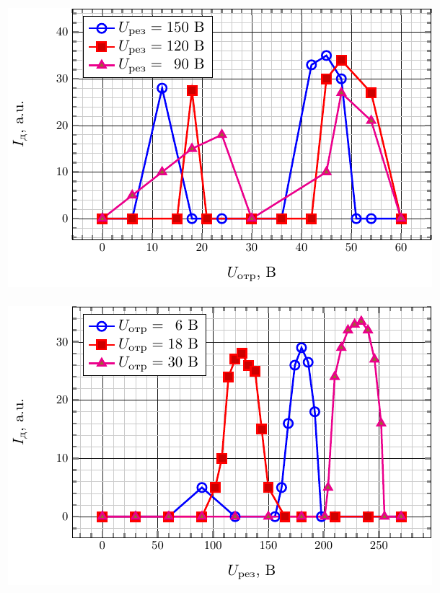 \documentclass[a4paper,14pt]{extarticle}
\begin{document}
\begin{figure}[H]
    \centering
    \includegraphics[scale=1.2]{fig2/id_from_uo.pdf}
    \caption{}
    \label{ris:3}
\end{figure}

\begin{figure}[H]
    \centering
    \includegraphics[scale=1.2]{fig2/id_from_ur.pdf}
    \caption{}
    \label{ris:4}
\end{figure}

\end{document}
